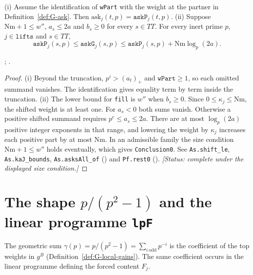 \begin{lemma}\label{lem:G-ask-compare}
(i) Assume the identification of \texttt{wPart} with the weight at the partner in Definition~\ref{def:G-ask}. Then $\mathrm{ask}_j(t,p)=\texttt{askP}_j(t,p)$.
(ii) Suppose $\mathrm{Nm}+1\le w''$, $a_s\le 2a$ and $b_s\ge0$ for every $s\in TT$. For every inert prime $p$, $j\in\texttt{lifts}$ and $s\in TT$,
\[
 \texttt{askP}_j(s,p)\le\texttt{askG}_j(s,p)\le\texttt{askP}_j(s,p)+\mathrm{Nm}\log_p(2a).
\]
\par{\small {}; .}\par
\end{lemma}
\begin{proof}
(i) Beyond the truncation, $p^i>(a_t)_+$ and $\texttt{wPart}\ge1$, so each omitted summand vanishes.
The identification gives equality term by term inside the truncation.
(ii) The lower bound for \texttt{fill} is $w''$ when $b_s\ge0$. Since $0\le\kappa_j\le\mathrm{Nm}$, the shifted weight is at least one. For $a_s<0$ both sums vanish. Otherwise a positive shifted summand requires $p^e\le a_s\le 2a$. There are at most $\log_p(2a)$ positive integer exponents in that range, and lowering the weight by $\kappa_j$ increases each positive part by at most $\mathrm{Nm}$. In an admissible family the size condition $\mathrm{Nm}+1\le w''$ holds eventually, which gives \texttt{Conclusion0}. See \texttt{As.shift\_le}, \texttt{As.kaJ\_bounds}, \texttt{As.asksAll\_of}
()
and \texttt{Pf.rest0} ().
\textit{[Status: complete under the displayed size condition.]}
\end{proof}

\section{The shape $p/(p^{2}-1)$ and the linear programme \texttt{lpF}}\label{sec:G-lpF}

The geometric sum $\gamma(p)=p/(p^{2}-1)=\sum_{i\ \mathrm{odd}}p^{-i}$ is the
coefficient of the top weights in $g^B$ (Definition~\ref{def:G-local-gains}).
The same coefficient occurs in the linear programme defining the forced content $F_j$.

